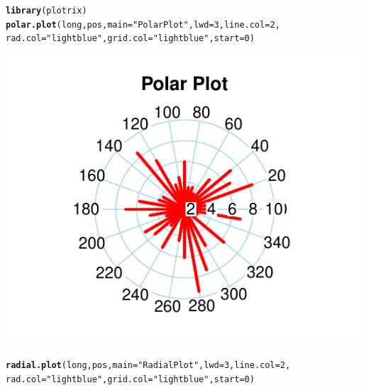 \documentclass{article}\usepackage[]{graphicx}\usepackage[]{color}
\makeatletter
\def\maxwidth{ %
  \ifdim\Gin@nat@width>\linewidth
    \linewidth
  \else
    \Gin@nat@width
  \fi
}
\newcommand{\hlnum}[1]{\textcolor[rgb]{0.686,0.059,0.569}{#1}}%
\newcommand{\hlstr}[1]{\textcolor[rgb]{0.192,0.494,0.8}{#1}}%
\newcommand{\hlstd}[1]{\textcolor[rgb]{0.345,0.345,0.345}{#1}}%
\newcommand{\hlkwc}[1]{\textcolor[rgb]{0.333,0.667,0.333}{#1}}%
\newcommand{\hlkwd}[1]{\textcolor[rgb]{0.737,0.353,0.396}{\textbf{#1}}}%
\newenvironment{kframe}{%
 \def\at@end@of@kframe{}%
 \ifinner\ifhmode%
  \def\at@end@of@kframe{\end{minipage}}%
  \begin{minipage}{\columnwidth}%
 \fi\fi%
 \def\FrameCommand##1{\hskip\@totalleftmargin \hskip-\fboxsep
 \colorbox{shadecolor}{##1}\hskip-\fboxsep
     \hskip-\linewidth \hskip-\@totalleftmargin \hskip\columnwidth}%
 \MakeFramed {\advance\hsize-\width
   \@totalleftmargin\z@ \linewidth\hsize
   \@setminipage}}%
 {\par\unskip\endMakeFramed%
 \at@end@of@kframe}
\newenvironment{knitrout}{}{} %
\makeatother
\begin{document}
\begin{knitrout}
\color{fgcolor}\begin{kframe}
\begin{alltt}
\hlkwd{library}\hlstd{(plotrix)}
\hlkwd{polar.plot}\hlstd{(long, pos,}\hlkwc{main}\hlstd{=}\hlstr{"Polar Plot"}\hlstd{,}\hlkwc{lwd}\hlstd{=}\hlnum{3}\hlstd{,}\hlkwc{line.col}\hlstd{=}\hlnum{2}\hlstd{,}
           \hlkwc{rad.col}\hlstd{=} \hlstr{"lightblue"}\hlstd{,} \hlkwc{grid.col}\hlstd{=} \hlstr{"lightblue"}\hlstd{,}\hlkwc{start} \hlstd{=} \hlnum{0}\hlstd{)}
\end{alltt}
\end{kframe}

{\centering \includegraphics[width=\maxwidth]{figure/plot_plotrix_cr-1} 

}


\begin{kframe}\begin{alltt}
\hlkwd{radial.plot}\hlstd{(long, pos,}\hlkwc{main}\hlstd{=}\hlstr{"Radial Plot"}\hlstd{,}\hlkwc{lwd}\hlstd{=}\hlnum{3}\hlstd{,}\hlkwc{line.col}\hlstd{=}\hlnum{2}\hlstd{,}
           \hlkwc{rad.col}\hlstd{=} \hlstr{"lightblue"}\hlstd{,} \hlkwc{grid.col}\hlstd{=} \hlstr{"lightblue"}\hlstd{,} \hlkwc{start} \hlstd{=} \hlnum{0}\hlstd{)}
\end{alltt}
\end{kframe}


\end{knitrout}
\end{document}
